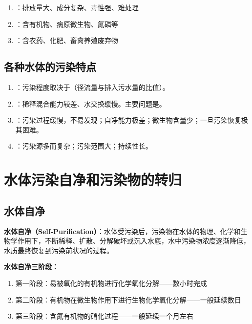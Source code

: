 \begin{enumerate}[leftmargin=*]
    \item {}：排放量大、成分复杂、毒性强、难处理
    \item {}：含有机物、病原微生物、氮磷等
    \item {}：含农药、化肥、畜禽养殖废弃物
\end{enumerate}

\subsection{各种水体的污染特点}

\begin{keybox}
\begin{enumerate}[leftmargin=*]
    \item {}：污染程度取决于（径流量与排入污水量的比值）。
    \item {}：稀释混合能力较差、水交换缓慢。主要问题是。
    \item {}：污染过程缓慢，不易发现；自净能力极差；微生物含量少；一旦污染恢复极其困难。
    \item {}：污染源多而复杂；污染范围大；持续性长。
\end{enumerate}
\end{keybox}

\section{水体污染自净和污染物的转归}

\subsection{水体自净}

\begin{defbox}
\textbf{水体自净（Self-Purification）}：水体受污染后，污染物在水体的物理、化学和生物学作用下，不断稀释、扩散、分解破坏或沉入水底，水中污染物浓度逐渐降低，水质最终恢复到污染前状况的过程。
\end{defbox}

\textbf{水体自净三阶段：}
\begin{enumerate}[leftmargin=*]
    \item 第一阶段：易被氧化的有机物进行化学氧化分解——数小时完成
    \item 第二阶段：有机物在微生物作用下进行生物化学氧化分解——一般延续数日
    \item 第三阶段：含氮有机物的硝化过程——一般延续一个月左右
\end{enumerate}

